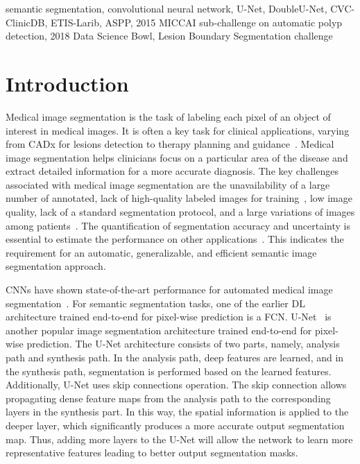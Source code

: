 \documentclass[conference]{IEEEtran}
\begin{document}
\begin{IEEEkeywords}
semantic segmentation, convolutional neural network, U-Net, DoubleU-Net,  CVC-ClinicDB, ETIS-Larib, \ac{ASPP}, 2015 MICCAI sub-challenge on automatic polyp detection, 2018 Data Science Bowl, Lesion Boundary Segmentation challenge
\end{IEEEkeywords}
\section{Introduction}
Medical image segmentation is the task of labeling each pixel of an object of interest in medical images. It is often a key task for clinical applications, varying from \ac{CADx} for lesions detection to therapy planning and guidance~\cite{le2015gpssi}. Medical image segmentation helps clinicians focus on a particular area of the disease and extract detailed information for a more accurate diagnosis. The key challenges associated with medical image segmentation are the unavailability of a large number of annotated, lack of high-quality labeled images for training~\cite{jha2020kvasir}, low image quality, lack of a standard segmentation protocol, and a large variations of images among patients~\cite{zhao2013overview}. The quantification of segmentation accuracy and uncertainty is essential to estimate the performance on other applications~\cite{le2015gpssi}. This indicates the requirement for an automatic, generalizable, and efficient semantic image segmentation approach. 



\acp{CNN} have shown state-of-the-art performance for automated medical image segmentation~\cite{litjens2017survey}. For semantic segmentation tasks, one of the earlier \acf{DL} architecture trained end-to-end for pixel-wise prediction is a \acf{FCN}. U-Net~\cite{ronneberger2015u} is another popular image segmentation architecture trained end-to-end for pixel-wise prediction. The U-Net architecture consists of two parts, namely, analysis path and synthesis path. In the analysis path, deep features are learned, and in the synthesis path, segmentation is performed based on the learned features.  Additionally, U-Net uses skip connections operation. The skip connection allows propagating dense feature maps from the analysis path to the corresponding layers in the synthesis part. In this way, the spatial information is applied to the deeper layer, which significantly produces a more accurate output segmentation map. Thus, adding more layers to the U-Net will allow the network to learn more representative features leading to better output segmentation masks.
\end{document}
